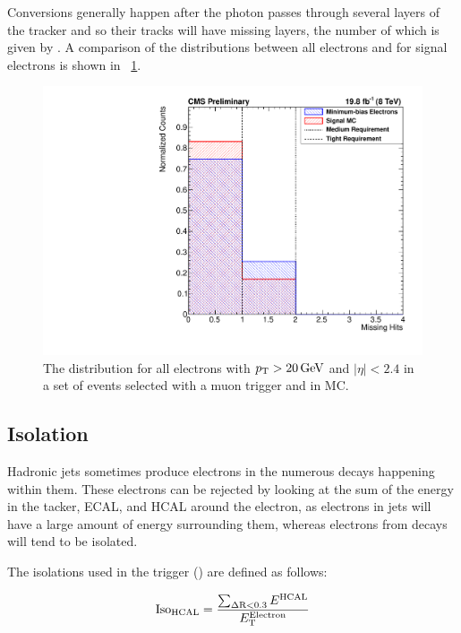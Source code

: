 Conversions generally happen after the photon passes through several layers of
the tracker and so their tracks will have missing layers, the number of which
is given by \nmiss. A comparison of the \nmiss distributions between all
electrons and for signal electrons is shown in \FIG~\ref{fig:nmiss}.

\begin{figure}[!htbp]
    \centering
    \includegraphics[width=\StackedPlotWidth]{figures/e_reco_var_nmiss.pdf}
    \caption[
        Distributions of \nmiss in data and MC.
    ]{
        The \nmiss distribution for all electrons with $p_{\mathrm{T}} > 20 \,\text{Ge\hspace{-.08em}V}$ and
        $|\eta| < 2.4$ in a set of events selected with a muon trigger and in
        \MADGRAPH \Ztoee MC.
    }
    \label{fig:nmiss}
\end{figure}

\subsection{Isolation}

Hadronic jets sometimes produce electrons in the numerous decays happening
within them. These electrons can be rejected by looking at the sum of the
energy in the tacker, ECAL, and HCAL around the electron, as electrons in jets
will have a large amount of energy surrounding them, whereas electrons from \Z
decays will tend to be isolated.

The isolations used in the trigger (\SingleElectronTrigger) are defined as
follows:

\begin{equation}
    \text{Iso}_{\text{HCAL}} = \frac{\sum_{\Delta \text{R}<0.3} E^{\text{HCAL}}}{E_{\mathrm{T}}^{\text{Electron}}}
\end{equation}

